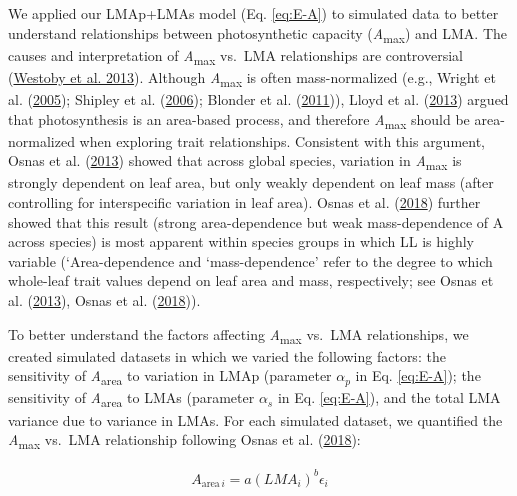 \documentclass[
  12pt,
  a4paper,
,tablecaptionabove
]{scrartcl}
\begin{document}
We applied our LMAp+LMAs model (Eq. \eqref{eq:E-A}) to simulated data to better understand relationships between photosynthetic capacity (\emph{A}\textsubscript{max}) and LMA.
The causes and interpretation of \emph{A}\textsubscript{max} vs.~LMA relationships are controversial (\protect\hyperlink{ref-Westoby2013}{Westoby et al. 2013}).
Although \emph{A}\textsubscript{max} is often mass-normalized (e.g., Wright et al. (\protect\hyperlink{ref-Wright2005}{2005}); Shipley et al. (\protect\hyperlink{ref-Shipley2006}{2006}); Blonder et al. (\protect\hyperlink{ref-Blonder2011}{2011})), Lloyd et al. (\protect\hyperlink{ref-Lloyd2013}{2013}) argued that photosynthesis is an area-based process, and therefore \emph{A}\textsubscript{max} should be area-normalized when exploring trait relationships.
Consistent with this argument, Osnas et al. (\protect\hyperlink{ref-Osnas2013}{2013}) showed that across global species, variation in \emph{A}\textsubscript{max} is strongly dependent on leaf area, but only weakly dependent on leaf mass (after controlling for interspecific variation in leaf area).
Osnas et al. (\protect\hyperlink{ref-Osnas2018}{2018}) further showed that this result (strong area-dependence but weak mass-dependence of A across species) is most apparent within species groups in which LL is highly variable (`Area-dependence and `mass-dependence' refer to the degree to which whole-leaf trait values depend on leaf area and mass, respectively; see Osnas et al. (\protect\hyperlink{ref-Osnas2013}{2013}), Osnas et al. (\protect\hyperlink{ref-Osnas2018}{2018})).

To better understand the factors affecting \emph{A}\textsubscript{max} vs.~LMA relationships, we created simulated datasets in which we varied the following factors: the sensitivity of \emph{A}\textsubscript{area} to variation in LMAp (parameter \(\alpha_p\) in Eq. \eqref{eq:E-A}); the sensitivity of \emph{A}\textsubscript{area} to LMAs (parameter \(\alpha_s\) in Eq. \eqref{eq:E-A}), and the total LMA variance due to variance in LMAs.
For each simulated dataset, we quantified the \emph{A}\textsubscript{max} vs.~LMA relationship following Osnas et al. (\protect\hyperlink{ref-Osnas2018}{2018}):

\begin{align}
A_{\mathrm{area} \, i} = a (LMA_i)^{b}\epsilon_i \tag{8}
\end{align}
\end{document}
